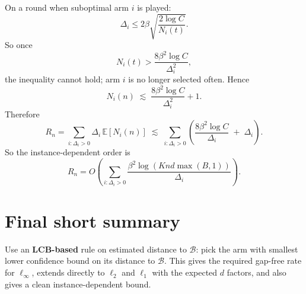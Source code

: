 \documentclass[11pt]{article}
\begin{document}
On a round when suboptimal arm $i$ is played:
\[
\Delta_i \le 2\beta\sqrt{\frac{2\log C}{N_i(t)}}.
\]
So once
\[
N_i(t) > \frac{8\beta^2\log C}{\Delta_i^2},
\]
the inequality cannot hold; arm $i$ is no longer selected often.
Hence
\[
N_i(n)\;\lesssim\;\frac{8\beta^2\log C}{\Delta_i^2}+1.
\]
Therefore
\[
R_n
=
\sum_{i:\Delta_i>0}\Delta_i\,\mathbb{E}[N_i(n)]
\;\lesssim\;
\sum_{i:\Delta_i>0}
\left(
\frac{8\beta^2\log C}{\Delta_i}
\;+\;
\Delta_i
\right).
\]
So the instance-dependent order is
\[
R_n
=
O\!\left(
\sum_{i:\Delta_i>0}
\frac{\beta^2\log(Knd\max(B,1))}{\Delta_i}
\right).
\]

\section*{Final short summary}

Use an \textbf{LCB-based} rule on estimated distance to $\mathcal{B}$:
pick the arm with smallest lower confidence bound on its distance to $\mathcal{B}$.
This gives the required gap-free rate for $\ell_\infty$, extends directly to $\ell_2$ and $\ell_1$ with the expected $d$ factors, and also gives a clean instance-dependent bound.
\end{document}
